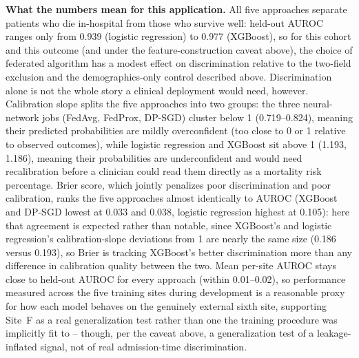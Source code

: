\documentclass[10pt,a4paper]{article}
\begin{document}
\textbf{What the numbers mean for this application.} All five approaches separate
patients who die in-hospital from those who survive well: held-out AUROC ranges only
from 0.939 (logistic regression) to 0.977 (XGBoost), so for this cohort and this
outcome (and under the feature-construction caveat above), the choice of federated
algorithm has a modest effect on discrimination relative to the two-field exclusion
and the demographics-only control described above. Discrimination alone is not the
whole story a clinical deployment would need, however. Calibration slope splits the
five approaches into two groups: the three neural-network jobs (FedAvg, FedProx,
DP-SGD) cluster below 1 (0.719--0.824), meaning their predicted probabilities are
mildly overconfident (too close to 0 or 1 relative to observed outcomes), while
logistic regression and XGBoost sit above 1 (1.193, 1.186), meaning their
probabilities are underconfident and would need recalibration before a clinician
could read them directly as a mortality risk percentage. Brier score, which jointly
penalizes poor discrimination and poor calibration, ranks the five approaches almost
identically to AUROC (XGBoost and DP-SGD lowest at 0.033 and 0.038, logistic
regression highest at 0.105): here that agreement is expected rather than notable,
since XGBoost's and logistic regression's calibration-slope deviations from 1 are
nearly the same size (0.186 versus 0.193), so Brier is tracking XGBoost's better
discrimination more than any difference in calibration quality between the two.
Mean per-site AUROC stays close to held-out AUROC for every approach (within
0.01--0.02), so performance measured across the five training sites during
development is a reasonable proxy for how each model behaves on the genuinely
external sixth site, supporting Site~F as a real generalization test rather than one
the training procedure was implicitly fit to -- though, per the caveat above, a
generalization test of a leakage-inflated signal, not of real admission-time
discrimination.
\end{document}
